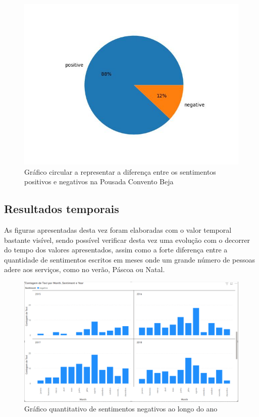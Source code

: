 \begin{figure}[!htb]
\centering
\includegraphics[width=14cm]{figuras/TripAdvisor/Hotels/hotel0_sentiments.jpeg}
\caption{Gráfico circular a representar a diferença entre os sentimentos positivos e negativos na Pousada Convento Beja}
\label{fig:sentpercetpcbeja}
\end{figure}

\clearpage
\subsection{Resultados temporais}

As figuras apresentadas desta vez foram elaboradas com o valor temporal bastante visível, sendo possível verificar desta vez uma evolução com o decorrer do tempo dos valores apresentados, assim como a forte diferença entre a quantidade de sentimentos escritos em meses onde um grande número de pessoas adere aos serviços, como no verão, Páscoa ou Natal.

\begin{figure}[!htb]
\centering
\includegraphics[width=14cm]{figuras/NegPerYear/1.PNG}
\caption{Gráfico quantitativo de sentimentos negativos ao longo do ano}
\label{fig:sentpercentbejatimed}
\end{figure}

